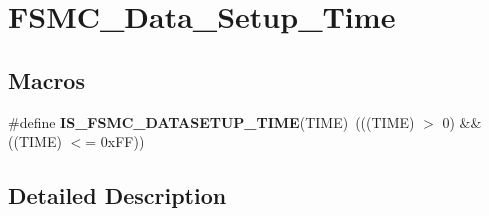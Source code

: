 \hypertarget{group___f_s_m_c___data___setup___time}{}\section{F\+S\+M\+C\+\_\+\+Data\+\_\+\+Setup\+\_\+\+Time}
\label{group___f_s_m_c___data___setup___time}
\subsection*{Macros}
\begin{DoxyCompactItemize}
\item 
\hypertarget{group___f_s_m_c___data___setup___time_ga3d923de775489e844913b29e77e8cca7}{}\#define {\bfseries I\+S\+\_\+\+F\+S\+M\+C\+\_\+\+D\+A\+T\+A\+S\+E\+T\+U\+P\+\_\+\+T\+I\+M\+E}(T\+I\+M\+E)~(((T\+I\+M\+E) $>$ 0) \&\& ((T\+I\+M\+E) $<$= 0x\+F\+F))\label{group___f_s_m_c___data___setup___time_ga3d923de775489e844913b29e77e8cca7}

\end{DoxyCompactItemize}


\subsection{Detailed Description}
